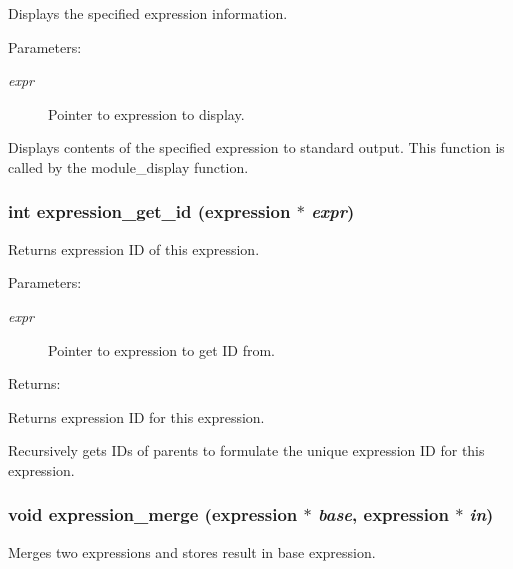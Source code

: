 Displays the specified expression information.

\begin{Desc}
\item[Parameters: ]\par
\begin{description}
\item[{\em 
expr}]Pointer to expression to display.\end{description}
\end{Desc}
Displays contents of the specified expression to standard output. This function is called by the module\_\-display function. 
\subsubsection{\setlength{\rightskip}{0pt plus 5cm}int expression\_\-get\_\-id ({\bf expression} $\ast$ {\em expr})}\label{expr_8c_a9}


Returns expression ID of this expression.

\begin{Desc}
\item[Parameters: ]\par
\begin{description}
\item[{\em 
expr}]Pointer to expression to get ID from. \end{description}
\end{Desc}
\begin{Desc}
\item[Returns: ]\par
Returns expression ID for this expression.\end{Desc}
Recursively gets IDs of parents to formulate the unique expression ID for this expression. 
\subsubsection{\setlength{\rightskip}{0pt plus 5cm}void expression\_\-merge ({\bf expression} $\ast$ {\em base}, {\bf expression} $\ast$ {\em in})}\label{expr_8c_a8}


Merges two expressions and stores result in base expression.


